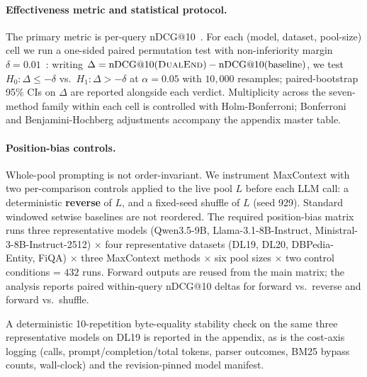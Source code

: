 \paragraph{Effectiveness metric and statistical protocol.}
The primary metric is per-query nDCG@10~\citep{jarvelin2002cumulated}. For each (model, dataset, pool-size) cell we run a one-sided paired permutation test with non-inferiority margin $\delta{=}0.01$~\citep{efron1993bootstrap,smucker2007comparison,urbano2019significance}: writing $\Delta = \mathrm{nDCG@10}(\textsc{DualEnd}) - \mathrm{nDCG@10}(\text{baseline})$, we test $H_0\!:\Delta \le -\delta$ vs.\ $H_1\!:\Delta > -\delta$ at $\alpha{=}0.05$ with $10{,}000$ resamples; paired-bootstrap 95\% CIs on $\Delta$ are reported alongside each verdict. Multiplicity across the seven-method family within each cell is controlled with Holm-Bonferroni; Bonferroni and Benjamini-Hochberg adjustments accompany the appendix master table.

\paragraph{Position-bias controls.}
Whole-pool prompting is not order-invariant. We instrument MaxContext with two per-comparison controls applied to the live pool $L$ before each LLM call: a deterministic \textbf{reverse} of $L$, and a fixed-seed shuffle of $L$ (seed 929). Standard windowed setwise baselines are not reordered. The required position-bias matrix runs three representative models (Qwen3.5-9B, Llama-3.1-8B-Instruct, Ministral-3-8B-Instruct-2512) $\times$ four representative datasets (DL19, DL20, DBPedia-Entity, FiQA) $\times$ three MaxContext methods $\times$ six pool sizes $\times$ two control conditions = $432$ runs. Forward outputs are reused from the main matrix; the analysis reports paired within-query nDCG@10 deltas for forward vs.\ reverse and forward vs.\ shuffle.

A deterministic 10-repetition byte-equality stability check on the same three representative models on DL19 is reported in the appendix, as is the cost-axis logging (calls, prompt/completion/total tokens, parser outcomes, BM25 bypass counts, wall-clock) and the revision-pinned model manifest.
